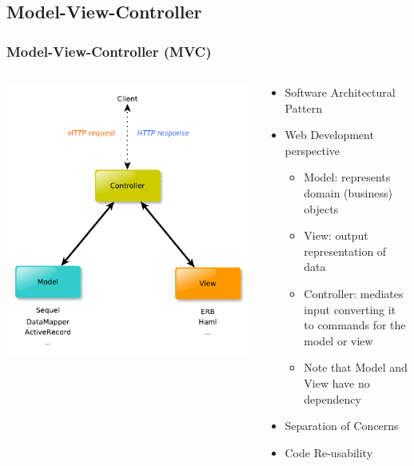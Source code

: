 \documentclass{beamer}
\begin{document}
\subsection{Model-View-Controller}
\begin{frame}[fragile]\frametitle{Model-View-Controller (MVC)}

  \begin{columns}[c] 

    \begin{column}{6cm}
      \includegraphics[scale=0.45]{diagrams/mvc.pdf}  
    \end{column}

    \begin{column}{6cm}
      \begin{itemize}
        \item Software Architectural Pattern
        \item Web Development perspective
        \begin{itemize}
          \item Model: represents domain (business) objects
          \item View: output representation of data
          \item Controller: mediates input converting it to commands for the model or view
          \item Note that Model and View have no dependency
        \end{itemize}
        \item Separation of Concerns
        \item Code Re-usability
      \end{itemize}
    \end{column}

  \end{columns}

\end{frame}
\end{document}
